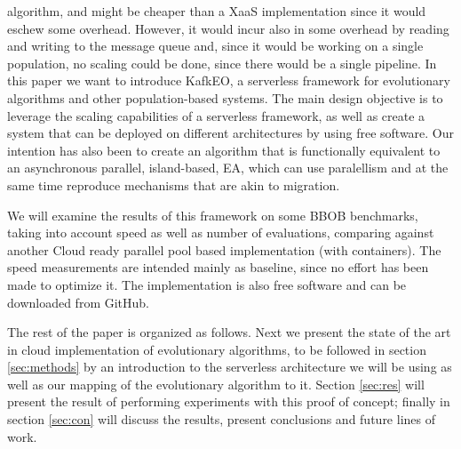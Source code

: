 \documentclass[sigconf]{acmart}
\begin{document}
algorithm, and might be cheaper than a XaaS implementation since it
would eschew some overhead. However, it would incur also in some
overhead by reading and writing to the message queue and, since it
would be working on a single population, no scaling could be done,
since there would be a single pipeline.
In this paper we want to introduce KafkEO, a serverless framework for
evolutionary algorithms and other population-based systems. The main
design objective is to leverage the scaling capabilities of a
serverless framework, as well as create a system that can be deployed
on different architectures by using free software. Our intention has
also been to create an algorithm that is functionally equivalent to an asynchronous
parallel, island-based, EA, which can use paralellism and at the same
time reproduce mechanisms that are akin to migration.

We will examine the results of this framework on some BBOB benchmarks,
taking into account speed as well as number of evaluations, comparing
against another Cloud ready parallel pool based implementation (with
containers). The speed measurements are intended mainly as baseline,
since no effort has been made to optimize it.
The
implementation is also free software and can be downloaded from
GitHub.



The rest of the paper is organized as follows. Next we present the
state of the art in cloud implementation of evolutionary algorithms,
to be followed in section \ref{sec:methods} by an introduction to the
serverless architecture we will be using as well as our mapping of the
evolutionary algorithm to it. Section \ref{sec:res} will present the
result of performing experiments with this proof of concept; finally
in section \ref{sec:con} will discuss the results, present conclusions
and future lines of work.
\end{document}
